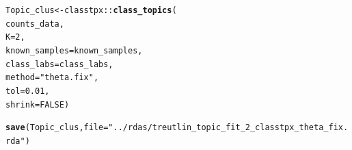 \documentclass[12pt]{article}\usepackage[]{graphicx}\usepackage[usenames,dvipsnames]{color}
\makeatletter
\newcommand{\hlnum}[1]{\textcolor[rgb]{0.686,0.059,0.569}{#1}}%
\newcommand{\hlstr}[1]{\textcolor[rgb]{0.192,0.494,0.8}{#1}}%
\newcommand{\hlopt}[1]{\textcolor[rgb]{0,0,0}{#1}}%
\newcommand{\hlstd}[1]{\textcolor[rgb]{0.345,0.345,0.345}{#1}}%
\newcommand{\hlkwb}[1]{\textcolor[rgb]{0.69,0.353,0.396}{#1}}%
\newcommand{\hlkwc}[1]{\textcolor[rgb]{0.333,0.667,0.333}{#1}}%
\newcommand{\hlkwd}[1]{\textcolor[rgb]{0.737,0.353,0.396}{\textbf{#1}}}%
\newenvironment{kframe}{%
 \def\at@end@of@kframe{}%
 \ifinner\ifhmode%
  \def\at@end@of@kframe{\end{minipage}}%
  \begin{minipage}{\columnwidth}%
 \fi\fi%
 \def\FrameCommand##1{\hskip\@totalleftmargin \hskip-\fboxsep
 \colorbox{shadecolor}{##1}\hskip-\fboxsep
     \hskip-\linewidth \hskip-\@totalleftmargin \hskip\columnwidth}%
 \MakeFramed {\advance\hsize-\width
   \@totalleftmargin\z@ \linewidth\hsize
   \@setminipage}}%
 {\par\unskip\endMakeFramed%
 \at@end@of@kframe}
\newenvironment{knitrout}{}{} %
\makeatother
\begin{document}
\begin{knitrout}
\color{fgcolor}\begin{kframe}
\begin{alltt}
\hlstd{Topic_clus} \hlkwb{<-} \hlstd{classtpx}\hlopt{::}\hlkwd{class_topics}\hlstd{(}
    \hlstd{counts_data,}
    \hlkwc{K}\hlstd{=}\hlnum{2}\hlstd{,}
    \hlkwc{known_samples} \hlstd{= known_samples,}
    \hlkwc{class_labs} \hlstd{= class_labs,}
    \hlkwc{method}\hlstd{=}\hlstr{"theta.fix"}\hlstd{,}
    \hlkwc{tol}\hlstd{=}\hlnum{0.01}\hlstd{,}
    \hlkwc{shrink}\hlstd{=}\hlnum{FALSE}\hlstd{)}

\hlkwd{save}\hlstd{(Topic_clus,} \hlkwc{file}\hlstd{=}\hlstr{"../rdas/treutlin_topic_fit_2_classtpx_theta_fix.rda"}\hlstd{)}
\end{alltt}
\end{kframe}
\end{knitrout}
\end{document}
